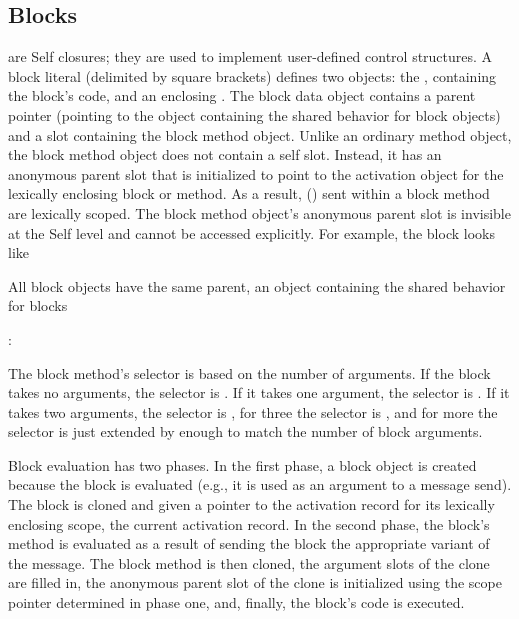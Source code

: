 \documentclass[letterpaper,10pt,english]{sphinxmanual}
\begin{document}
\subsection{Blocks}
\label{\detokenize{langref:pp-langref-blocks}}\label{\detokenize{langref:blocks}}\label{\detokenize{langref:index-26}}
 are Self closures; they are used to implement user-defined control structures. A block literal
(delimited by square brackets) defines two objects: the , containing the
block’s code, and an enclosing . The block data object contains a parent pointer
(pointing to the object containing the shared behavior for block objects) and a slot containing the
block method object. Unlike an ordinary method object, the block method object does not contain
a self slot. Instead, it has an anonymous parent slot that is initialized to point to the activation object
for the lexically enclosing block or method. As a result,  ({\hyperref[\detokenize{langref:pp-implicit-receiver}]{}})
sent within a block method are lexically scoped. The block method object’s anonymous parent slot
is invisible at the Self level and cannot be accessed explicitly.
\newpage
For example, the block \sphinxcode{{[} 3 + 4 {]}} looks like %
\begin{footnote}[3]\sphinxAtStartFootnote
All block objects have the same parent, an object containing the shared behavior for blocks
%
\end{footnote}:
\begin{figure}[htbp]
\centering

\noindent{}
\end{figure}

The block method’s selector is based on the number of arguments. If the block takes no arguments,
the selector is . If it takes one argument, the selector is . If it takes two arguments,
the selector is , for three the selector is , and for more the selector
is just extended by enough  to match the number of block arguments.

Block evaluation has two phases. In the first phase, a block object is created because the block is
evaluated (e.g., it is used as an argument to a message send). The block is cloned and given a
pointer to the activation record for its lexically enclosing scope, the current activation record. In the
second phase, the block’s method is evaluated as a result of sending the block the appropriate variant
of the  message. The block method is then cloned, the argument slots of the clone are
filled in, the anonymous parent slot of the clone is initialized using the scope pointer determined in
phase one, and, finally, the block’s code is executed.
\end{document}
